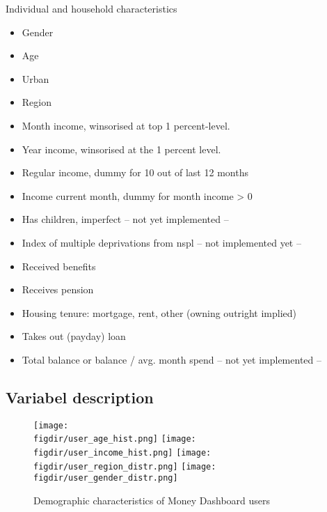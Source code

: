 Individual and household characteristics
\begin{itemize}
    \item Gender

    \item Age

    \item Urban

    \item Region

    \item Month income, winsorised at top 1 percent-level.

    \item Year income, winsorised at the 1 percent level.

    \item Regular income, dummy for 10 out of last 12 months

    \item Income current month, dummy for month income > 0

    \item Has children, imperfect -- not yet implemented --

    \item Index of multiple deprivations from nspl -- not implemented yet --

    \item Received benefits

    \item Receives pension

    \item Housing tenure: mortgage, rent, other (owning outright implied)

    \item Takes out (payday) loan

    \item Total balance or balance / avg. month spend -- not yet implemented --
\end{itemize}







\subsection{Variabel description}%
\label{sub:variabel_description}

\begin{figure}[H]
    \caption{Demographic characteristics of Money Dashboard users}
    \label{fig:demographics}
    \begin{center}
        \texttt{[image: \\figdir/user\_age\_hist.png]}
        \texttt{[image: \\figdir/user\_income\_hist.png]}
        \texttt{[image: \\figdir/user\_region\_distr.png]}
        \texttt{[image: \\figdir/user\_gender\_distr.png]}
    \end{center}
\end{figure}

